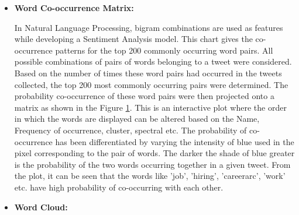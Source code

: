 \documentclass[9pt,twocolumn,twoside]{styles/osajnl}
\begin{document}
\begin{itemize}
    \item \textbf{Word Co-occurrence Matrix:}\\
    \begin{figure}[hbt]
    \centering
    \caption{}
    \label{fig:wordcooccur}
    \end{figure}
    In Natural Language Processing, bigram combinations are used as features while developing a Sentiment Analysis model. This chart gives the co-occurrence patterns for the top 200 commonly occurring word pairs. All possible combinations of pairs of words belonging to a tweet were considered. Based on the number of times these word pairs had occurred in the tweets collected, the top 200 most commonly occurring pairs were determined. The probability co-occurrence of these word pairs were then projected onto a matrix \cite{www-cooccur} as shown in the Figure \ref{fig:wordcooccur}. This is an interactive plot where the order in which the words are displayed can be altered based on the Name, Frequency of occurrence, cluster, spectral \cite{www-reorder} etc. The probability of co-occurrence has been differentiated by varying the intensity of blue used in the pixel corresponding to the pair of words. The darker the shade of blue greater is the probability of the two words occurring together in a given tweet. From the plot, it can be seen that the words like 'job', 'hiring', 'careerarc', 'work' etc. have high probability of co-occurring with each other. 
    \item \textbf{Word Cloud:}

\end{itemize}
\end{document}
